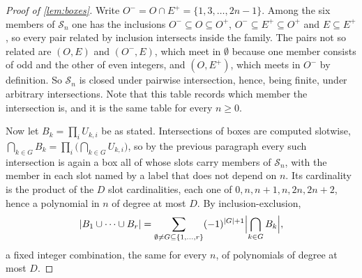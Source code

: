\documentclass[11pt]{amsart}
\theoremstyle{definition}
\theoremstyle{remark}
\begin{document}
\begin{proof}[Proof of \cref{lem:boxes}]
Write $O^{-} = O \cap E^{+} = \{1,3,\dots,2n-1\}$. Among the six members of $\mathcal{S}_{n}$ one has the inclusions $O^{-} \subseteq O \subseteq O^{+}$, $O^{-} \subseteq E^{+} \subseteq O^{+}$ and $E \subseteq E^{+}$, so every pair related by inclusion intersects inside the family. The pairs not so related are $(O,E)$ and $(O^{-},E)$, which meet in $\emptyset$ because one member consists of odd and the other of even integers, and $(O,E^{+})$, which meets in $O^{-}$ by definition. So $\mathcal{S}_{n}$ is closed under pairwise intersection, hence, being finite, under arbitrary intersections. Note that this table records which member the intersection is, and it is the same table for every $n \ge 0$.

Now let $B_{k} = \prod_{i}U_{k,i}$ be as stated. Intersections of boxes are computed slotwise, $\bigcap_{k \in G}B_{k} = \prod_{i}\bigl(\bigcap_{k \in G}U_{k,i}\bigr)$, so by the previous paragraph every such intersection is again a box all of whose slots carry members of $\mathcal{S}_{n}$, with the member in each slot named by a label that does not depend on $n$. Its cardinality is the product of the $D$ slot cardinalities, each one of $0, n, n+1, n, 2n, 2n+2$, hence a polynomial in $n$ of degree at most $D$. By inclusion-exclusion,
\[
  |B_{1} \cup \cdots \cup B_{r}| = \sum_{\emptyset \neq G \subseteq \{1,\dots,r\}}(-1)^{|G|+1}\Bigl|\bigcap_{k \in G}B_{k}\Bigr| ,
\]
a fixed integer combination, the same for every $n$, of polynomials of degree at most $D$.
\end{proof}
\end{document}
